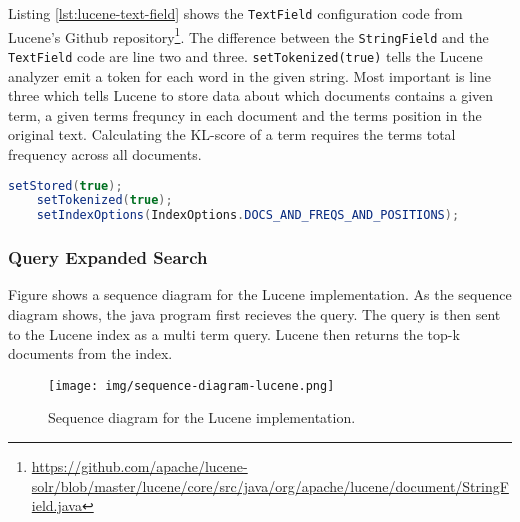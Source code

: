 Listing \ref{lst:lucene-text-field} shows the \texttt{TextField} configuration code from Lucene's Github repository\footnote{\url{https://github.com/apache/lucene-solr/blob/master/lucene/core/src/java/org/apache/lucene/document/StringField.java}}.
The difference between the \texttt{StringField} and the \texttt{TextField} code are line two and three.
\texttt{setTokenized(true)} tells the Lucene analyzer emit a token for each word in the given string.
Most important is line three which tells Lucene to store data about which documents contains a given term,
a given terms frequncy in each document and the terms position in the original text.
Calculating the KL-score of a term requires the terms total frequency across all documents.

\begin{lstlisting}[language=java, caption={Lucene's \texttt{TextField} index configuration.}, label={lst:lucene-text-field}]
    setStored(true);
    setTokenized(true);
    setIndexOptions(IndexOptions.DOCS_AND_FREQS_AND_POSITIONS);
\end{lstlisting}

\subsubsection{Query Expanded Search}
Figure shows a sequence diagram for the Lucene implementation.
As the sequence diagram shows, the java program first recieves the query.
The query is then sent to the Lucene index as a multi term query.
Lucene then returns the top-k documents from the index.



\begin{figure}[h!]
  \centering \texttt{[image: img/sequence-diagram-lucene.png]}
  \caption{Sequence diagram for the Lucene implementation.}
  \label{fig:sequence-diagram-lucene}
\end{figure}
